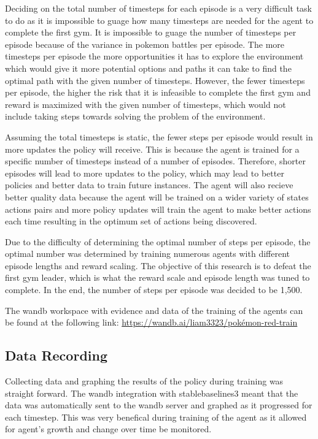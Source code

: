 Deciding on the total number of timesteps for each episode is a very difficult task to do as it is impossible to guage how many timesteps are needed for the agent to complete the first gym. It is impossible to guage the number of timesteps per episode because of the variance in pokemon battles per episode. The more timesteps per episode the more opportunities it has to explore the environment which would give it more potential options and paths it can take to find the optimal path with the given number of timesteps. However, the fewer timesteps per episode, the higher the risk that it is infeasible to complete the first gym and reward is maximized with the given number of timesteps, which would not include taking steps towards solving the problem of the environment. 

Assuming the total timesteps is static, the fewer steps per episode would result in more updates the policy will receive. This is because the agent is trained for a specific number of timesteps instead of a number of episodes. Therefore, shorter episodes will lead to more updates to the policy, which may lead to better policies and better data to train future instances. The agent will also recieve better quality data because the agent will be trained on a wider variety of states actions pairs and more policy updates will train the agent to make better actions each time resulting in the optimum set of actions being discovered.

Due to the difficulty of determining the optimal number of steps per episode, the optimal number was determined by training numerous agents with different episode lengths and reward scaling. The objective of this research is to defeat the first gym leader, which is what the reward scale and episode length was tuned to complete. In the end, the number of steps per episode was decided to be 1,500. 

The wandb workspace with evidence and data of the training of the agents can be found at the following link: \url{https://wandb.ai/liam3323/pokémon-red-train} \cite{wandb}

\subsection{Data Recording}

Collecting data and graphing the results of the policy during training was straight forward. The wandb integration with stablebaselines3 meant that the data was automatically sent to the wandb server and graphed as it progressed for each timestep. This was very benefical during training of the agent as it allowed for agent's growth and change over time be monitored.  
